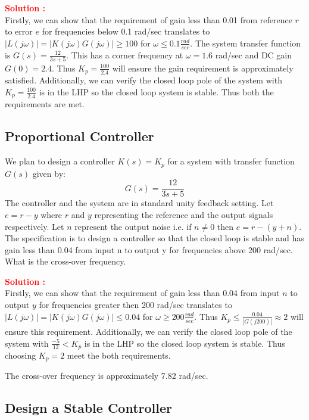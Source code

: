 \documentclass[12pt]{article}
\begin{document}
\textbf{\textcolor{red}{Solution :}} \\
Firstly, we can show that the requirement of gain less than 0.01 from reference $r$ to error $e$ for frequencies below 0.1 rad/sec translates to $|L(j \omega)|=|K(j \omega) G(j \omega)| \geq 100$ for $\omega \leq 0.1 \frac{rad}{sec}$. The system transfer function is $G(s) =\frac{12}{3s + 5}$. This has a corner frequency at  $\omega=1.6$ rad/sec and DC gain $G(0) = 2.4$. Thus $K_p =\frac{100}{2.4}$ will ensure the gain requirement is approximately satisfied. Additionally, we can verify the closed loop pole of the system with $K_p =\frac{100}{2.4}$ is in the LHP so the closed loop system is stable. Thus both the requirements are met.  
\clearpage

\subsection{Proportional Controller}

We plan to design a controller $K(s) = K_p$ for a system with transfer function $G(s)$ given by:
\[
G(s) = \frac{12}{3s + 5}
\]
The controller and the system are in standard unity feedback setting. Let $e=r-y$ where $r$ and $y$ representing the reference and the output signals respectively. Let $n$ represent the output noise i.e. if $n \neq 0$ then $e=r- (y+n)$. The specification is to design a controller so that the closed loop is stable and has gain less than 0.04 from input n to output y for frequencies above 200 rad/sec. What is the cross-over frequency. 
 
\textbf{\textcolor{red}{Solution :}} \\
Firstly, we can show that the requirement of gain less than 0.04 from input $n$ to output $y$ for frequencies greater then 200 rad/sec translates to $|L(j \omega)|=|K(j \omega) G(j \omega)| \leq 0.04$ for $\omega \geq 200 \frac{rad}{sec}$. Thus $K_p \leq \frac{0.04}{|G(j200)|} \approx 2$ will ensure this requirement. Additionally, we can verify the closed loop pole of the system with $\frac{-5}{12}<K_p$ is in the LHP so the closed loop system is stable. Thus choosing \(K_p = 2\) meet the both requirements.  

The cross-over frequency is approximately 7.82 rad/sec.\\
\clearpage

\subsection{Design a Stable Controller}
\end{document}

